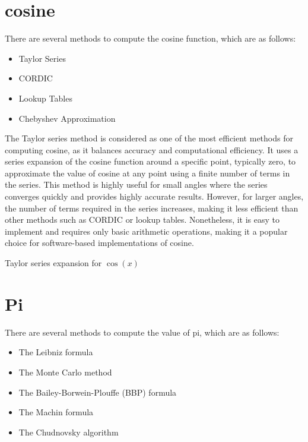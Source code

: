 \section{cosine \texorpdfstring{\small \cite{cos-press2007numerical}\cite{cos-abramowitz1964handbook}\cite{cos-marcum1969evaluation}}{}}
There are several methods to compute the cosine function, which are as follows:
\begin{itemize}
    \item Taylor Series
    \item CORDIC
     \item Lookup Tables
    \item Chebyshev Approximation
\end{itemize}

\noindent The Taylor series method is considered as one of the most efficient methods for computing cosine, as it balances accuracy and computational efficiency. It uses a series expansion of the cosine function around a specific point, typically zero, to approximate the value of cosine at any point using a finite number of terms in the series. This method is highly useful for small angles where the series converges quickly and provides highly accurate results. However, for larger angles, the number of terms required in the series increases, making it less efficient than other methods such as CORDIC or lookup tables. Nonetheless, it is easy to implement and requires only basic arithmetic operations, making it a popular choice for software-based implementations of cosine.

\begin{algorithm}[H]
\caption{Taylor series expansion for $\cos(x)$}\label{algo:cos}
\begin{algorithmic}[1]
\EndFor
{}
\end{algorithmic}
\end{algorithm}

\section{Pi \texorpdfstring{\small \cite{pi-rosettacodepi}\cite{pi-weissteinpi}\cite{pi-wikipediapi}}{}}
There are several methods to compute the value of pi, which are as follows:
\begin{itemize}
    \item The Leibniz formula
    \item The Monte Carlo method
    \item The Bailey-Borwein-Plouffe (BBP) formula
    \item The Machin formula
    \item The Chudnovsky algorithm
\end{itemize}

